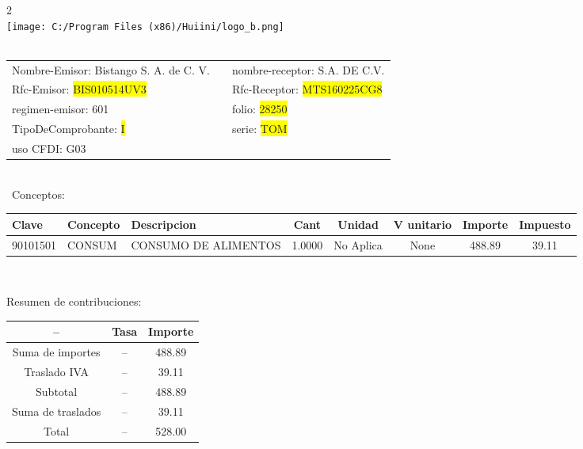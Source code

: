 \documentclass{article}
\begin{document}
\hspace{18cm} 2\\
\texttt{[image: C:/Program Files (x86)/Huiini/logo\_b.png]}
\bigskip\\\
\begin{tabular}{p{11cm}p{1cm}p{8cm}}

Nombre-Emisor: Bistango S. A. de C. V. && nombre-receptor: S.A. DE C.V.\\

Rfc-Emisor: \colorbox{yellow}{ BIS010514UV3 } & & Rfc-Receptor: \colorbox{yellow}{ MTS160225CG8 }\\

regimen-emisor: 601 & & folio: \colorbox{yellow}{ 28250 }\\

TipoDeComprobante: \colorbox{yellow}{ I } & & serie: \colorbox{yellow}{ TOM }\\

uso CFDI: G03\\



\end{tabular}
\bigskip\bigskip\bigskip\\\
Conceptos:\\
\begin{tabular}{|p{1.5cm}|p{3.6cm}|p{3.6cm}|c|c|c|c|c|}
\hline
Clave & Concepto & Descripcion & Cant & Unidad & V unitario & Importe & Impuesto \\
\hline

90101501 & CONSUM & CONSUMO DE ALIMENTOS & 1.0000 & No Aplica & None & 488.89 &  39.11 \\
\hline

\end{tabular}\\
\bigskip
\begin{center}
Resumen de contribuciones:\\
\bigskip
\begin{tabular}{|c|c|c|}
\hline
 -- & Tasa & Importe\\
\hline

Suma de importes & -- & 488.89 \\
\hline

Traslado IVA & -- & 39.11 \\
\hline

Subtotal  & -- & 488.89 \\
\hline

Suma de traslados & -- & 39.11 \\
\hline

Total  & -- & 528.00 \\
\hline

\end{tabular}
\end{center}
\end{document}
